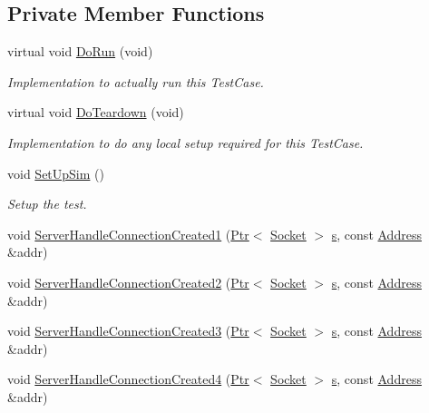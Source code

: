 \subsection*{Private Member Functions}
\begin{DoxyCompactItemize}
\item 
virtual void \hyperlink{classDualStackTestCase_a56472b295c6821c1380df84b130e6399}{Do\+Run} (void)
\begin{DoxyCompactList}\small\item\em Implementation to actually run this Test\+Case. \end{DoxyCompactList}\item 
virtual void \hyperlink{classDualStackTestCase_a600e6e7c1f4407316fdb699313948b65}{Do\+Teardown} (void)
\begin{DoxyCompactList}\small\item\em Implementation to do any local setup required for this Test\+Case. \end{DoxyCompactList}\item 
void \hyperlink{classDualStackTestCase_a04e3c01a5d12957f1f69d2df2e2c734c}{Set\+Up\+Sim} ()
\begin{DoxyCompactList}\small\item\em Setup the test. \end{DoxyCompactList}\item 
void \hyperlink{classDualStackTestCase_a098eaed91d8b1d9fe0ba46afa727c4fb}{Server\+Handle\+Connection\+Created1} (\hyperlink{classns3_1_1Ptr}{Ptr}$<$ \hyperlink{classns3_1_1Socket}{Socket} $>$ \hyperlink{generate__test__data__lte__sinr_8m_ad83eeb3a142285d1243a08c6b7026df8}{s}, const \hyperlink{classns3_1_1Address}{Address} \&addr)
\item 
void \hyperlink{classDualStackTestCase_a583491eee15aec59f0161742e95c3941}{Server\+Handle\+Connection\+Created2} (\hyperlink{classns3_1_1Ptr}{Ptr}$<$ \hyperlink{classns3_1_1Socket}{Socket} $>$ \hyperlink{generate__test__data__lte__sinr_8m_ad83eeb3a142285d1243a08c6b7026df8}{s}, const \hyperlink{classns3_1_1Address}{Address} \&addr)
\item 
void \hyperlink{classDualStackTestCase_a2468042017aabf296dadb138c99f7cf3}{Server\+Handle\+Connection\+Created3} (\hyperlink{classns3_1_1Ptr}{Ptr}$<$ \hyperlink{classns3_1_1Socket}{Socket} $>$ \hyperlink{generate__test__data__lte__sinr_8m_ad83eeb3a142285d1243a08c6b7026df8}{s}, const \hyperlink{classns3_1_1Address}{Address} \&addr)
\item 
void \hyperlink{classDualStackTestCase_a42eb5a5ef5cb90a76e0ef059580add7c}{Server\+Handle\+Connection\+Created4} (\hyperlink{classns3_1_1Ptr}{Ptr}$<$ \hyperlink{classns3_1_1Socket}{Socket} $>$ \hyperlink{generate__test__data__lte__sinr_8m_ad83eeb3a142285d1243a08c6b7026df8}{s}, const \hyperlink{classns3_1_1Address}{Address} \&addr)
\end{DoxyCompactItemize}
